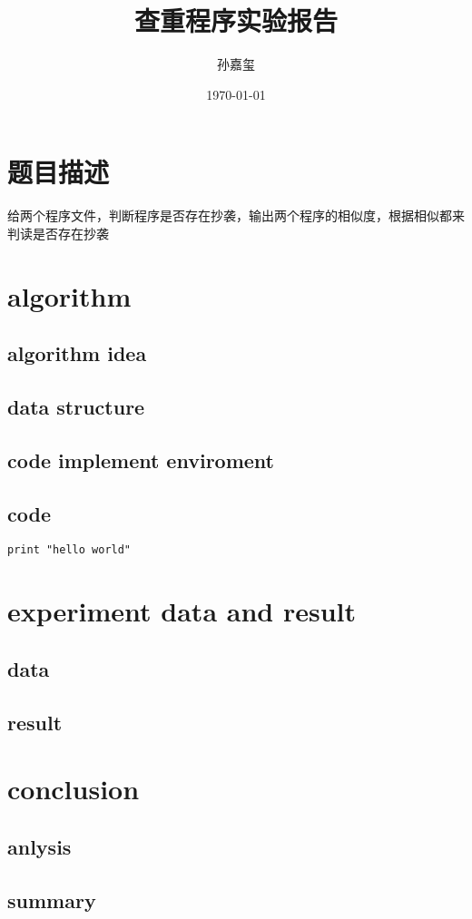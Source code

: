 \documentclass[UTF8]{ctexart}
\author{孙嘉玺
\\
\textt{22920162204038}
}
\date{\today}
\title{查重程序实验报告}
\begin{document}
\maketitle
\tableofcontents
\newpage

\section{题目描述}
给两个程序文件，判断程序是否存在抄袭，输出两个程序的相似度，根据相似都来判读是否存在抄袭
\section{algorithm}
\subsection{algorithm idea}
\subsection{data structure}
\subsection{code implement enviroment}
\subsection{code}

\lstset{language=python,
	frame=shadowbox}
\begin{lstlisting}
print "hello world"
\end{lstlisting}
\section{experiment data and result}
\subsection{data}
\subsection{result}

\section{conclusion}
\subsection{anlysis}
\subsection{summary}
\end{document}
